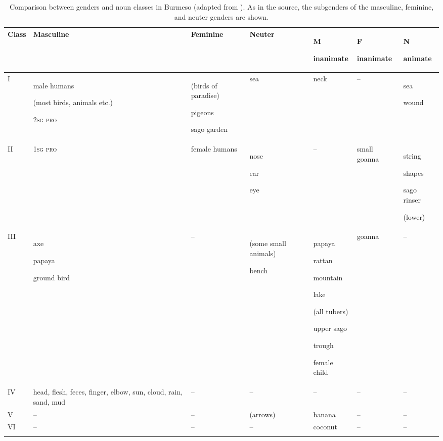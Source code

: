 \documentclass[output=collectionpaper]{langsci/langscibook}
\begin{document}
\begin{landscape}
\thispagestyle{empty}

\begin{table}
\small
\begin{tabularx}{\textwidth}{lQQQQQQ}
\lsptoprule

Class & Masculine & Feminine & Neuter & {M}

inanimate & {F}

inanimate & {N}

animate\\
\midrule
I & {male humans}

{(most birds, animals etc.)}

\textsc{2sg pro} & {(birds of paradise)}

{pigeons}

sago garden & sea & neck & – & {sea}

wound\\
II & \textsc{1sg pro} & female humans & {nose}

{ear}

eye & – & small goanna & {string}

{shapes}

{sago rinser}

(lower)\\
III & {axe}

{papaya}

ground bird & – & {(some small animals)}

bench & {papaya}

{rattan}

{mountain}

{lake}

{(all tubers)}

{upper sago}

{trough}

female child & goanna & –\\
IV & head, flesh, feces, finger, elbow, sun, cloud, rain, sand, mud & – & – & – & – & –\\
V & – & – & (arrows) & banana & – & –\\
VI & – & – & – & coconut & – & –\\
\lspbottomrule
\end{tabularx}
\caption{Comparison between genders and noun classes in Burmeso (adapted from \citealt[108]{Donohue2001}). As in the source, the subgenders of the masculine, feminine, and neuter genders are shown.}
\label{tab:Svard:15}
\end{table}

\end{landscape}
\end{document}
